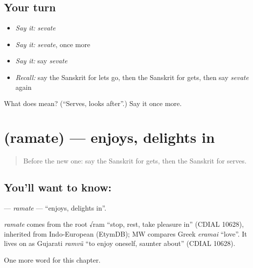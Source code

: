 \subsection*{Your turn}
\begin{itemize}
\raggedright
  \item \emph{Say it:} \emph{sevate}
  \item \emph{Say it:} \emph{sevate}, once more
  \item \emph{Say it:} say \emph{sevate}
  \item \emph{Recall:} say the Sanskrit for lets go, then the Sanskrit for gets, then say \emph{sevate} again
\end{itemize}

\begin{tcolorbox}[breakable,colback=teal!4,colframe=teal!35!black,title={Before you move on}]
What does  mean? (\textquotedblleft{}Serves, looks after\textquotedblright{}.) Say it once more.
\end{tcolorbox}
\section[\texorpdfstring{\sk{रमते} (ramate)}{रमते (ramate)}]{ (ramate) — enjoys, delights in}

\label{lesson:SA-C173-ramate}



\begin{quote}
Before the new one: say the Sanskrit for gets, then the Sanskrit for serves.
\end{quote}

\subsection*{You'll want to know: }
\textbf{} — \emph{ramate} — \textquotedblleft{}enjoys, delights in\textquotedblright{}.

\begin{cousinweb}
\emph{ramate} comes from the root √ram \textquotedblleft{}stop, rest, take pleasure in\textquotedblright{} (CDIAL 10628), inherited from Indo-European (EtymDB); MW compares Greek \emph{eramai} \textquotedblleft{}love\textquotedblright{}. It lives on as Gujarati \emph{ramvũ} \textquotedblleft{}to enjoy oneself, saunter about\textquotedblright{} (CDIAL 10628).
\end{cousinweb}

\begin{grammarlens}[title={What you've built}]
One more word for this chapter.
\end{grammarlens}

